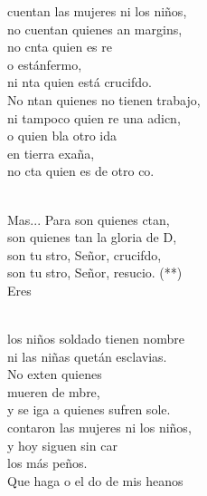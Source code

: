 \begin{cancion}%
	cuentan las mujeres ni los niños,\\
	no cuentan quienes an margins,\\
	no cnta quien es re \\
	o estánfermo,\\
	ni nta quien está crucifdo.\\
	No ntan quienes no tienen trabajo,\\
	ni tampoco quien re una adicn, \\
	o quien bla otro ida \\
	en tierra exaña,\\
	no cta quien es de otro co.\\\jump\\
	\begin{chorus}%
	Mas... Para  son quienes ctan,\\
	son quienes tan la gloria de D,\\
	son tu stro, Señor, crucifdo,\\
	son tu stro, Señor, resucio. (**)\\
	Eres  \\
	\end{chorus}%
	\jump\\
	los niños soldado tienen nombre\\
	ni las niñas quetán esclavias.\\
	No exten quienes \\
	 mueren de mbre,\\
	y se iga a quienes sufren sole.\\
	contaron las mujeres ni los niños,\\
	y hoy siguen sin car \\
	los más peños.\\
	Que haga o el do de mis heanos \\

\end{cancion}
